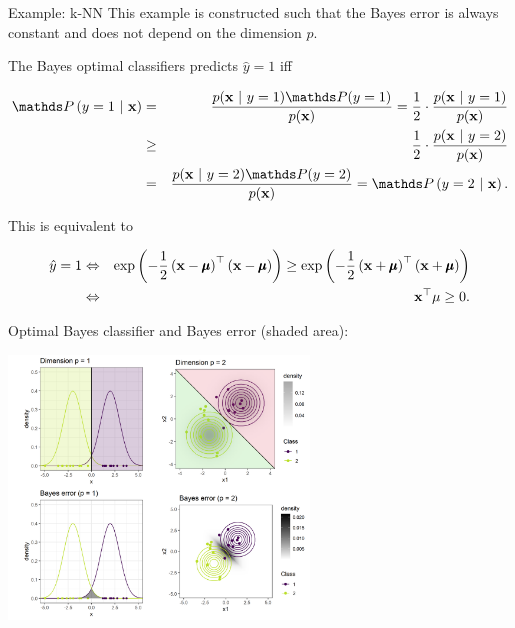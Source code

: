 \documentclass[11pt,compress,t,notes=noshow, xcolor=table]{beamer}
\begin{document}
\begin{vbframe}{Example: k-NN}
\framebreak 
This example is constructed such that the Bayes error is always constant and does not depend on the dimension $p$. 

\lz 

The Bayes optimal classifiers predicts $\hat y = 1$ iff

\begin{footnotesize}
  \begin{eqnarray*}
  \P\left(y = 1 ~|~ \xv\right) &=& \frac{p(\xv ~|~y = 1)\P(y = 1)}{p(\xv)} = \frac{1}{2} \cdot \frac{p(\xv ~|~y = 1)}{p(\xv)}\\
  &\ge& \frac{1}{2} \cdot \frac{p(\xv ~|~y = 2)}{p(\xv)} \\ &=& \frac{p(\xv ~|~y = 2)\P(y = 2)}{p(\xv)} = \P\left(y = 2 ~|~ \xv\right). 
  \end{eqnarray*}
\end{footnotesize}

This is equivalent to 

\vspace*{-0.5cm}

\begin{footnotesize}
  \begin{eqnarray*}
  \hat y = 1 &\Leftrightarrow& \exp\left(-\frac{1}{2} \left(\mathbf{x} - \pmb\mu\right)^\top \left(\mathbf{x} - \pmb\mu\right)\right) \ge \exp\left(-\frac{1}{2} \left(\mathbf{x} + \pmb\mu\right)^\top \left(\mathbf{x} + \pmb\mu\right)\right) \\
  &\Leftrightarrow& \mathbf{x}^\top \mu \ge 0. 
  \end{eqnarray*}
\end{footnotesize}

\framebreak

Optimal Bayes classifier and Bayes error (shaded area):

\begin{center}
\includegraphics[width = 8cm]{figure/knn_error_plot.png}
\end{center}



\end{vbframe}
\end{document}
